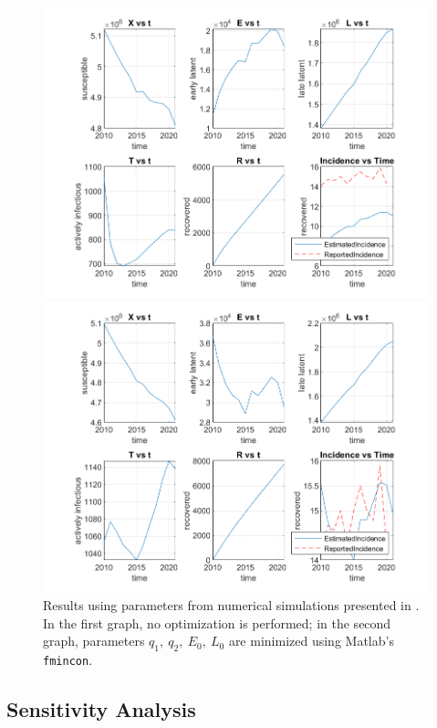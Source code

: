\documentclass[sn-mathphys,Numbered]{sn-jnl}%
\theoremstyle{thmstyleone}%
\theoremstyle{thmstyletwo}%
\theoremstyle{thmstylethree}%
\begin{document}
\begin{figure}
    \includegraphics[width=15cm]{PopVsTime_unoptimized.png}

    \includegraphics[width=15cm]{PopVsTime_optimized.png}

    \caption{Results using parameters from numerical simulations presented in \cite{Guo2011PersistentLatency}. In the first graph, no optimization is performed; in the second graph, parameters $q_1,~q_2,~E_0,~L_0$ are minimized using Matlab's \texttt{fmincon}. }
    \label{fig:OptimizedResults}
\end{figure}

\subsection{Sensitivity Analysis}
\end{document}
